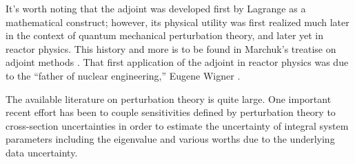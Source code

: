It's worth noting that the adjoint was developed first by Lagrange as a mathematical construct; however, its physical utility was first realized much later in the context of quantum mechanical perturbation theory, and later yet in reactor physics.  This history and more is to be found in Marchuk's treatise on adjoint methods \cite{marchuk1995aea}.  That first application of the adjoint in reactor physics was due to the ``father of nuclear engineering,'' Eugene Wigner \cite{wigner1945esp}.  

The available literature on perturbation theory is quite large.  One important recent effort has been to couple sensitivities defined by perturbation theory to cross-section uncertainties in order to estimate the uncertainty of integral system parameters including the eigenvalue \cite{broadhead2004sau} and various worths \cite{williams2007sau} due to the underlying data uncertainty.  

